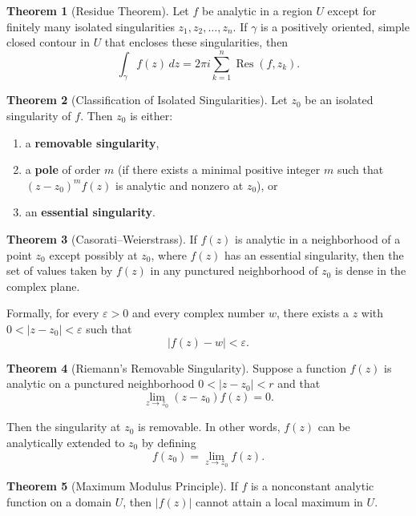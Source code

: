 \documentclass[12pt]{article}
\theoremstyle{definition} %
\newtheorem{theorem}{Theorem}
\theoremstyle{plain} %
\begin{document}
\begin{theorem}[Residue Theorem]
Let \(f\) be analytic in a region \(U\) except for finitely many isolated singularities \(z_1, z_2, \dots, z_n\). If \(\gamma\) is a positively oriented, simple closed contour in \(U\) that encloses these singularities, then
\[
\int_\gamma f(z)\,dz = 2\pi i \sum_{k=1}^{n} \operatorname{Res}(f,z_k).
\]
\end{theorem}

\begin{theorem}[Classification of Isolated Singularities]
Let \(z_0\) be an isolated singularity of \(f\). Then \(z_0\) is either:
\begin{enumerate}[label=(\roman*)]
    \item a \textbf{removable singularity},
    \item a \textbf{pole} of order \(m\) (if there exists a minimal positive integer \(m\) such that \((z-z_0)^m f(z)\) is analytic and nonzero at \(z_0\)), or
    \item an \textbf{essential singularity}.
\end{enumerate}
\end{theorem}

\begin{theorem}[Casorati–Weierstrass]
If \(f(z)\) is analytic in a neighborhood of a point \(z_0\) except possibly at \(z_0\), where \(f(z)\) has an essential singularity, then the set of values taken by \(f(z)\) in any punctured neighborhood of \(z_0\) is dense in the complex plane. 

Formally, for every \(\varepsilon > 0\) and every complex number \(w\), there exists a \(z\) with \(0 < |z - z_0| < \varepsilon\) such that
\[
|f(z) - w| < \varepsilon.
\]
\end{theorem}

\begin{theorem}[Riemann's Removable Singularity]
Suppose a function \( f(z) \) is analytic on a punctured neighborhood \(0 < |z - z_0| < r \) and that
\[
\lim_{z \to z_0}(z - z_0)f(z) = 0.
\]

Then the singularity at \( z_0 \) is removable. In other words, \( f(z) \) can be analytically extended to \( z_0 \) by defining
\[
f(z_0) = \lim_{z \to z_0} f(z).
\]
\end{theorem}

\begin{theorem}[Maximum Modulus Principle]
If \(f\) is a nonconstant analytic function on a domain \(U\), then \(|f(z)|\) cannot attain a local maximum in \(U\).
\end{theorem}
\end{document}
